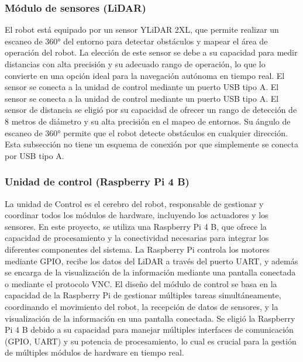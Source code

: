     \subsubsection{M\'odulo de sensores (LiDAR)} %
    \label{ssub:modsen}
    El robot est\'a equipado por un sensor YLiDAR 2XL, que permite realizar un escaneo de
        360° del entorno para detectar obst\'aculos y mapear el \'area de operaci\'on del robot. La
        elecci\'on de este sensor se debe a su capacidad para medir distancias con alta
        precisi\'on y su adecuado rango de operaci\'on, lo que lo convierte en una opci\'on ideal
        para la navegaci\'on aut\'onoma en tiempo real.
        El sensor se conecta a la unidad de control mediante un puerto USB tipo A.
    \vskip 0.5cm
    El sensor se conecta a la unidad de control mediante un puerto USB tipo A.
    \vskip 0.5cm
    El sensor de distancia se eligi\'o por su capacidad de ofrecer un rango de detecci\'on de
        8 metros de di\'ametro y su alta precisi\'on en el mapeo de entornos. Su \'angulo de
        escaneo de 360° permite que el robot detecte obst\'aculos en cualquier direcci\'on.
    \vskip 0.5cm
    Esta subsecci\'on no tiene un esquema de conexi\'on por que simplemente se conecta
        por USB tipo A.
    \vskip 0.5cm
    \subsubsection{Unidad de control (Raspberry Pi 4 B)} %
    \label{ssub:modcon}
    La unidad de Control es el cerebro del robot, responsable de gestionar y coordinar
        todos los m\'odulos de hardware, incluyendo los actuadores y los sensores. En este
        proyecto, se utiliza una Raspberry Pi 4 B, que ofrece la capacidad de procesamiento y
        la conectividad necesarias para integrar los diferentes componentes del sistema.
    \vskip 0.5cm
    La Raspberry Pi controla los motores mediante GPIO, recibe los datos del LiDAR a
        trav\'es del puerto UART, y adem\'as se encarga de la visualizaci\'on de la informaci\'on
        mediante una pantalla conectada o mediante el protocolo VNC.
    \vskip 0.5cm
    El dise\~no del m\'odulo de control se basa en la capacidad de la Raspberry Pi de gestionar
        m\'ultiples tareas simult\'aneamente, coordinando el movimiento del robot, la recepci\'on
        de datos de sensores, y la visualizaci\'on de la informaci\'on en una pantalla conectada.
    \vskip 0.5cm
    Se eligi\'o la Raspberry Pi 4 B debido a su capacidad para manejar m\'ultiples interfaces
        de comunicaci\'on (GPIO, UART) y su potencia de procesamiento, lo cual es crucial para
        la gesti\'on de m\'ultiples m\'odulos de hardware en tiempo real.
    \vskip 0.5cm
